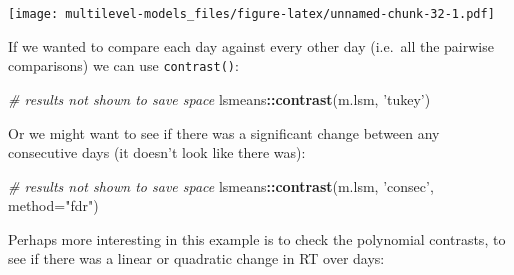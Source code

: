 \documentclass[]{article}
\newenvironment{Shaded}{\begin{snugshade}}{\end{snugshade}}
\newcommand{\KeywordTok}[1]{\textcolor[rgb]{0.13,0.29,0.53}{\textbf{#1}}}
\newcommand{\DataTypeTok}[1]{\textcolor[rgb]{0.13,0.29,0.53}{#1}}
\newcommand{\DecValTok}[1]{\textcolor[rgb]{0.00,0.00,0.81}{#1}}
\newcommand{\StringTok}[1]{\textcolor[rgb]{0.31,0.60,0.02}{#1}}
\newcommand{\CommentTok}[1]{\textcolor[rgb]{0.56,0.35,0.01}{\textit{#1}}}
\newcommand{\OperatorTok}[1]{\textcolor[rgb]{0.81,0.36,0.00}{\textbf{#1}}}
\newcommand{\NormalTok}[1]{#1}
\theoremstyle{definition}
\theoremstyle{definition}
\theoremstyle{definition}
\theoremstyle{remark}
\begin{document}
\begin{Shaded}
\end{Shaded}

\texttt{[image: multilevel-models\_files/figure-latex/unnamed-chunk-32-1.pdf]}

If we wanted to compare each day against every other day (i.e.~all the
pairwise comparisons) we can use \texttt{contrast()}:

\begin{Shaded}
\begin{Highlighting}[]
\CommentTok{# results not shown to save space}
\NormalTok{lsmeans}\OperatorTok{::}\KeywordTok{contrast}\NormalTok{(m.lsm, }\StringTok{'tukey'}\NormalTok{) }
\end{Highlighting}
\end{Shaded}

Or we might want to see if there was a significant change between any
consecutive days (it doesn't look like there was):

\begin{Shaded}
\begin{Highlighting}[]
\CommentTok{# results not shown to save space}
\NormalTok{lsmeans}\OperatorTok{::}\KeywordTok{contrast}\NormalTok{(m.lsm, }\StringTok{'consec'}\NormalTok{, }\DataTypeTok{method=}\StringTok{"fdr"}\NormalTok{) }
\end{Highlighting}
\end{Shaded}

Perhaps more interesting in this example is to check the polynomial
contrasts, to see if there was a linear or quadratic change in RT over
days:

\begin{Shaded}
\end{Shaded}
\end{document}
